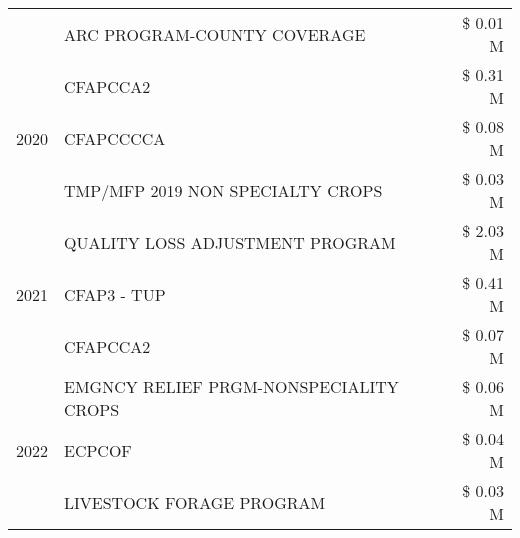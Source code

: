 \begin{tabular}{llr}
 & ARC PROGRAM-COUNTY COVERAGE & \$ 0.01 M \\
\cline{1-3}
\multirow[t]{3}{*}{2020} & CFAPCCA2 & \$ 0.31 M \\
 & CFAPCCCCA & \$ 0.08 M \\
 & TMP/MFP 2019 NON SPECIALTY CROPS & \$ 0.03 M \\
\cline{1-3}
\multirow[t]{3}{*}{2021} & QUALITY LOSS ADJUSTMENT PROGRAM & \$ 2.03 M \\
 & CFAP3 - TUP & \$ 0.41 M \\
 & CFAPCCA2 & \$ 0.07 M \\
\cline{1-3}
\multirow[t]{3}{*}{2022} & EMGNCY RELIEF PRGM-NONSPECIALITY CROPS & \$ 0.06 M \\
 & ECPCOF & \$ 0.04 M \\
 & LIVESTOCK FORAGE PROGRAM & \$ 0.03 M \\
\cline{1-3}
\bottomrule
\end{tabular}
